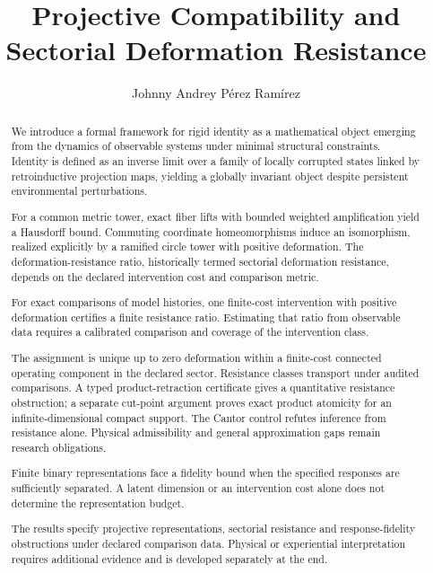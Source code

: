 \documentclass[11pt,a4paper]{article}
\title{\textbf{Projective Compatibility and Sectorial Deformation Resistance}}
\author{Johnny Andrey P\'{e}rez Ram\'{i}rez}
\date{}
\theoremstyle{plain}
\theoremstyle{definition}
\theoremstyle{remark}
\begin{document}
\setlength{\emergencystretch}{3em}
\maketitle

\begin{abstract}
We introduce a formal framework for rigid identity as a mathematical object emerging from the dynamics of observable systems under minimal structural constraints. Identity is defined as an inverse limit over a family of locally corrupted states linked by retroinductive projection maps, yielding a globally invariant object despite persistent environmental perturbations.

For a common metric tower, exact fiber lifts with bounded weighted amplification yield a Hausdorff bound. Commuting coordinate homeomorphisms induce an isomorphism, realized explicitly by a ramified circle tower with positive deformation. The deformation-resistance ratio, historically termed sectorial deformation resistance, depends on the declared intervention cost and comparison metric.

For exact comparisons of model histories, one finite-cost intervention with positive deformation certifies a finite resistance ratio. Estimating that ratio from observable data requires a calibrated comparison and coverage of the intervention class.

The assignment is unique up to zero deformation within a finite-cost connected operating component in the declared sector. Resistance classes transport under audited comparisons. A typed product-retraction certificate gives a quantitative resistance obstruction; a separate cut-point argument proves exact product atomicity for an infinite-dimensional compact support. The Cantor control refutes inference from resistance alone. Physical admissibility and general approximation gaps remain research obligations.

Finite binary representations face a fidelity bound when the specified responses are sufficiently separated. A latent dimension or an intervention cost alone does not determine the representation budget.

The results specify projective representations, sectorial resistance and response-fidelity obstructions under declared comparison data. Physical or experiential interpretation requires additional evidence and is developed separately at the end.
\end{abstract}
\end{document}
